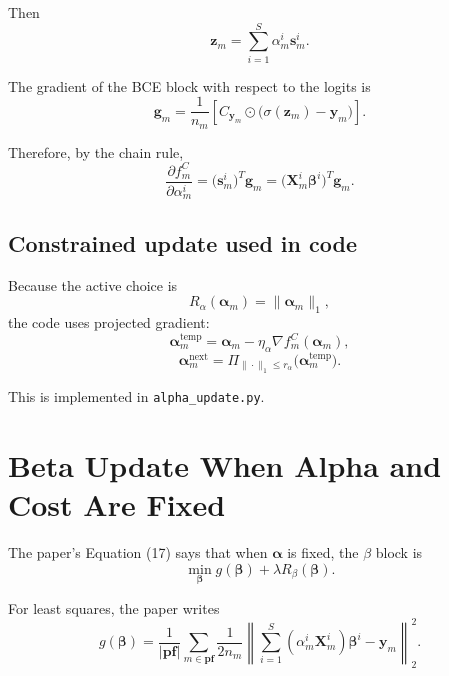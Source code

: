 \documentclass[11pt]{article}
\newcommand{\pf}{\mathbf{pf}}
\newcommand{\Xm}{\mathbf{X}_m}
\newcommand{\ym}{\mathbf{y}_m}
\newcommand{\zm}{\mathbf{z}_m}
\newcommand{\alpham}{\boldsymbol{\alpha}_m}
\newcommand{\betai}{\boldsymbol{\beta}^i}
\newcommand{\betavec}{\boldsymbol{\beta}}
\newcommand{\alphavec}{\boldsymbol{\alpha}}
\newcommand{\sigmoid}{\sigma}
\begin{document}
Then
\begin{equation}
\label{eq:z-as-source-scores}
\zm
=
\sum_{i=1}^{S} \alpha_m^i \mathbf{s}_m^i.
\end{equation}

The gradient of the BCE block with respect to the logits is
\begin{equation}
\label{eq:gm-logits}
\mathbf{g}_m
=
\frac{1}{n_m}
\left[
C_{\mathbf{y}_m}
\odot
\big(\sigmoid(\zm) - \ym\big)
\right].
\end{equation}

Therefore, by the chain rule,
\begin{equation}
\label{eq:alpha-gradient}
\frac{\partial f_m^C}{\partial \alpha_m^i}
=
\big(\mathbf{s}_m^i\big)^T \mathbf{g}_m
=
\big(\Xm^i \betai\big)^T \mathbf{g}_m.
\end{equation}

\subsection{Constrained update used in code}

Because the active choice is
\begin{equation}
\label{eq:alpha-l1-choice}
R_{\alpha}(\alpham) = \|\alpham\|_1,
\end{equation}
the code uses projected gradient:
\begin{equation}
\label{eq:alpha-temp}
\alpham^{\mathrm{temp}}
=
\alpham
- \eta_{\alpha} \nabla f_m^C(\alpham),
\end{equation}
\begin{equation}
\label{eq:alpha-projection}
\alpham^{\mathrm{next}}
=
\Pi_{\|\cdot\|_1 \le r_{\alpha}}
\big(
\alpham^{\mathrm{temp}}
\big).
\end{equation}

This is implemented in \texttt{alpha\_update.py}.

\section{Beta Update When Alpha and Cost Are Fixed}

The paper's Equation (17) says that when $\alphavec$ is fixed, the $\beta$
block is
\begin{equation}
\label{eq:paper17}
\min_{\betavec}
g(\betavec) + \lambda R_{\beta}(\betavec).
\end{equation}

For least squares, the paper writes
\begin{equation}
\label{eq:paper17-g}
g(\betavec)
=
\frac{1}{|\pf|}
\sum_{m \in \pf}
\frac{1}{2n_m}
\left\|
\sum_{i=1}^{S}
(\alpha_m^i \Xm^i)\betai
- \ym
\right\|_2^2.
\end{equation}
\end{document}
